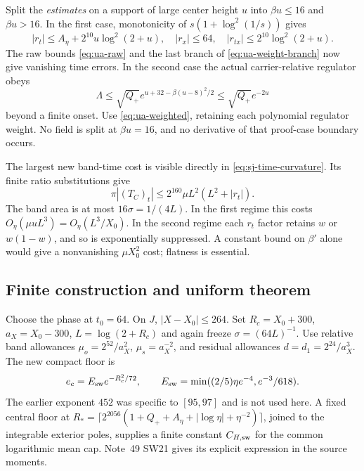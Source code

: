 Split the \emph{estimates} on a support of large center height $u$ into
$\beta u\le16$ and $\beta u>16$. In the first case, monotonicity of
$s(1+\log^2(1/s))$ gives
\begin{equation}
 |r_t|\le A_\eta+2^{10}u\log^2(2+u),\quad
 |r_x|\le64,\quad |r_{tx}|\le2^{10}\log^2(2+u).
 \label{eq:ua-switch-weights}
\end{equation}
The raw bounds \eqref{eq:ua-raw} and the last branch of
\eqref{eq:ua-weight-branch} now give vanishing time errors.
In the second case the actual carrier-relative regulator obeys
\[
 \Lambda\le\sqrt{Q_+}
   e^{u+32-\beta(u-8)^2/2}\le\sqrt{Q_+}e^{-2u}
\]
beyond a finite onset. Use \eqref{eq:ua-weighted}, retaining each
polynomial regulator weight. No field is split at $\beta u=16$,
and no derivative of that proof-case boundary occurs.

The largest new band-time cost is visible directly in
\eqref{eq:sj-time-curvature}. Its finite ratio substitutions give
\begin{equation}
 \pi|(T_C)_t|\le2^{160}\mu L^2(L^2+|r_t|).
 \label{eq:ua-worst-row}
\end{equation}
The band area is at most $16\sigma=1/(4L)$. In the first regime
this costs $O_\eta(\mu uL^3)=O_\eta(L^3/X_0)$.
In the second regime each $r_t$ factor retains $w$ or $w(1-w)$,
and so is exponentially suppressed. A constant bound on $\beta'$
alone would give a nonvanishing $\mu X_0^2$ cost; flatness is essential.

\subsection{Finite construction and uniform theorem}
Choose the phase at $t_0=64$. On $J$, $|X-X_0|\le264$.
Set $R_c=X_0+300$, $a_X=X_0-300$, $L=\log(2+R_c)$ and again
freeze $\sigma=(64L)^{-1}$. Use relative band allowances
$\mu_o=2^{52}/a_X^2$, $\mu_s=a_X^{-2}$, and residual allowances
$d=d_1=2^{24}/a_X^3$. The new compact floor is
\begin{equation}
 e_c=E_{\rm sw}e^{-R_c^2/72},\qquad
 E_{\rm sw}=\min((2/5)\eta e^{-4},e^{-3}/618).
 \label{eq:ua-switch-floor}
\end{equation}
The earlier exponent $452$ was specific to $[95,97]$ and is not used
here. A fixed central floor at
$R_*=\lceil2^{2056}(1+Q_++A_\eta+|\log\eta|+\eta^{-2})\rceil$,
joined to the integrable exterior poles, supplies a finite constant
$C_{H,\rm sw}$ for the common logarithmic mean cap. Note~49 SW21
gives its explicit expression in the source moments.

